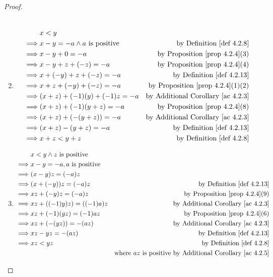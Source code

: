 \begin{proof}
\begin{enumerate}
\begin{align*}
        \end{align*}
    \item {}
        \begin{align*}
                     & x < y \\
            \implies & x - y = -a \land a \text{ is positive} & \text{by \DEF{4.2.8}} \\
            \implies & x - y + 0 = -a & \text{by \PROP{4.2.4}(3)} \\
            \implies & x - y + z + (-z) = -a & \text{by \PROP{4.2.4}(4)} \\
            \implies & x + (-y) + z + (-z) = -a & \text{by \DEF{4.2.13}} \\
            \implies & x + z + (-y) + (-z) = -a & \text{by \PROP{4.2.4}(1)(2)} \\
            \implies & (x + z) + (-1)(y) + (-1)z = -a & \text{by \AC{4.2.3}} \\
            \implies & (x + z) + (-1)(y + z) = -a & \text{by \PROP{4.2.4}(8)} \\
            \implies & (x + z) + (-(y + z)) = -a & \text{by \AC{4.2.3}} \\
            \implies & (x + z) - (y + z) = -a & \text{by \DEF{4.2.13}} \\
            \implies & x + z < y + z & \text{by \DEF{4.2.8}}
        \end{align*}
    \item {}
        \begin{align*}
                     & x < y \land z \text{ is positive} \\
            \implies & x - y = -a, a \text{ is positive} \\
            \implies & (x - y)z = (-a)z \\
            \implies & (x + (-y))z = (-a)z & \text{by \DEF{4.2.13}} \\
            \implies & xz + (-y)z = (-a)z & \text{by \PROP{4.2.4}(9)} \\
            \implies & xz + ((-1)y)z) = ((-1)a)z & \text{by \AC{4.2.3}} \\
            \implies & xz + (-1)(yz) = (-1)az & \text{by \PROP{4.2.4}(6)} \\
            \implies & xz + (-(yz)) = -(az) & \text{by \AC{4.2.3}} \\
            \implies & xz - yz = -(az) & \text{by \DEF{4.2.13}} \\
            \implies & xz < yz & \text{by \DEF{4.2.8}} \\
                     &         & \text{where \(az\) is positive by \AC{4.2.5}}
        \end{align*}
\end{enumerate}
\end{proof}

